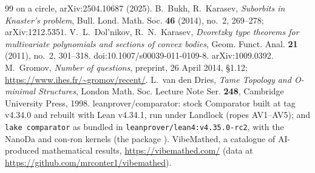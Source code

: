 \documentclass[11pt]{amsart}
\theoremstyle{plain}
\theoremstyle{definition}
\begin{document}
\begin{thebibliography}{99}
{on a circle}, arXiv:2504.10687 (2025).
 B.~Bukh, R.~Karasev, \emph{Suborbits in Knaster's problem}, Bull. Lond. Math. Soc.
\textbf{46} (2014), no.~2, 269--278; arXiv:1212.5351.
 V.~L.~Dol'nikov, R.~N.~Karasev, \emph{Dvoretzky type theorems for multivariate
polynomials and sections of convex bodies}, Geom. Funct. Anal. \textbf{21} (2011), no.~2, 301--318.
doi:10.1007/s00039-011-0109-8. arXiv:1009.0392.
 M.~Gromov, \emph{Number of questions}, preprint, 26 April 2014, \S1.12;
\url{https://www.ihes.fr/~gromov/recent/}.
 L.~van den Dries, \emph{Tame Topology and O-minimal Structures}, London Math. Soc.
Lecture Note Ser. \textbf{248}, Cambridge University Press, 1998.
 leanprover/comparator: stock Comparator built at tag v4.34.0 and rebuilt with Lean
v4.34.1, run under Landlock (ropes AV1--AV5); and \texttt{lake comparator} as bundled in
\texttt{leanprover/lean4:v4.35.0-rc2}, with the NanoDa and con-ron kernels (the package \cite{MR}).
 VibeMathed, a catalogue of AI-produced mathematical results, \url{https://vibemathed.com/}
(data at \url{https://github.com/mrconter1/vibemathed}).
\end{thebibliography}
\end{document}
